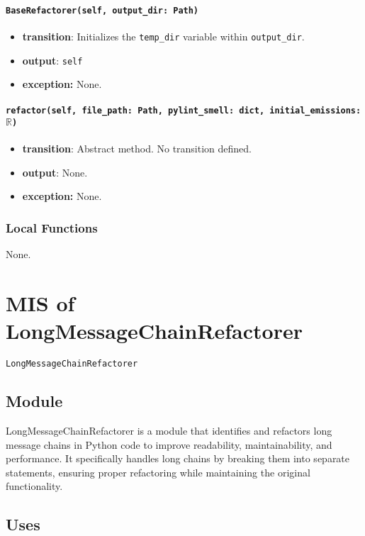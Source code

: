 \documentclass[12pt, titlepage]{article}
\begin{document}
\paragraph{\texttt{BaseRefactorer(self, output\_dir: Path)}}
\begin{itemize}
  \item \textbf{transition}: Initializes the \texttt{temp\_dir} variable within \texttt{output\_dir}.
  \item \textbf{output}: \texttt{self}
  \item \textbf{exception:} None.
\end{itemize}

\paragraph{\texttt{refactor(self, file\_path: Path, pylint\_smell: dict, initial\_emissions: $\mathbb{R}$)}}
\begin{itemize}
  \item \textbf{transition}: Abstract method. No transition defined.
  \item \textbf{output}: None.
  \item \textbf{exception:} None.
\end{itemize}

\subsubsection{Local Functions}
None.

\newpage


\section{MIS of LongMessageChainRefactorer} \label{mis:LMC}

\texttt{LongMessageChainRefactorer}

\subsection{Module}

LongMessageChainRefactorer is a module that identifies and refactors long message chains in Python code to improve readability, maintainability, and performance. It specifically handles long chains by breaking them into separate statements, ensuring proper refactoring while maintaining the original functionality.

\subsection{Uses}
\end{document}
